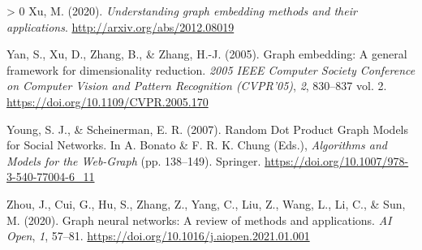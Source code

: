 \documentclass[10pt,oneside]{article}
\newlength{\cslhangindent}
\newenvironment{CSLReferences}[3] %
 {%
  \setlength{\parindent}{0pt}
  \ifodd #1 \everypar{\setlength{\hangindent}{\cslhangindent}}\ignorespaces\fi
  \ifnum #2 > 0
  \setlength{\parskip}{#2\baselineskip}
  \fi
 }%
 {}
\begin{document}
\begin{CSLReferences}{1}{0}
\leavevmode\hypertarget{ref-Xu2020UndGra}{}%
Xu, M. (2020). \emph{Understanding graph embedding methods and their
applications}. \url{http://arxiv.org/abs/2012.08019}

\leavevmode\hypertarget{ref-Yan2005GraEmb}{}%
Yan, S., Xu, D., Zhang, B., \& Zhang, H.-J. (2005). Graph embedding: A
general framework for dimensionality reduction. \emph{2005 IEEE Computer
Society Conference on Computer Vision and Pattern Recognition
(CVPR'05)}, \emph{2}, 830--837 vol. 2.
\url{https://doi.org/10.1109/CVPR.2005.170}

\leavevmode\hypertarget{ref-Young2007RanDot}{}%
Young, S. J., \& Scheinerman, E. R. (2007). Random Dot Product Graph
Models for Social Networks. In A. Bonato \& F. R. K. Chung (Eds.),
\emph{Algorithms and Models for the Web-Graph} (pp. 138--149). Springer.
\url{https://doi.org/10.1007/978-3-540-77004-6_11}

\leavevmode\hypertarget{ref-Zhou2020GraNeu}{}%
Zhou, J., Cui, G., Hu, S., Zhang, Z., Yang, C., Liu, Z., Wang, L., Li,
C., \& Sun, M. (2020). Graph neural networks: A review of methods and
applications. \emph{AI Open}, \emph{1}, 57--81.
\url{https://doi.org/10.1016/j.aiopen.2021.01.001}

\end{CSLReferences}
\end{document}
